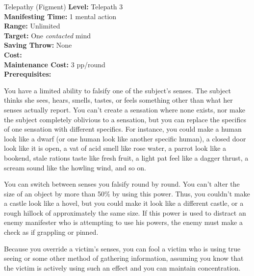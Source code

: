 {Telepathy (Figment)}
{
    \textbf{Level:}
    Telepath 3\\
    \textbf{Manifesting Time:}
    1 mental action\\
    \textbf{Range:}
    Unlimited\\
    \textbf{Target:}
    One \emph{contacted} mind\\
    \textbf{Saving Throw:}
    None\\
    \textbf{Cost:}
    \\
    \textbf{Maintenance Cost:}
    3 pp/round\\
    \textbf{Prerequisites:}
    \\
}
{
    You have a limited ability to falsify one of the subject's senses. The subject thinks she sees, hears, smells, tastes, or feels something other than what her senses actually report. You can't create a sensation where none exists, nor make the subject completely oblivious to a sensation, but you can replace the specifics of one sensation with different specifics. For instance, you could make a human look like a dwarf (or one human look like another specific human), a closed door look like it is open, a vat of acid smell like rose water, a parrot look like a bookend, stale rations taste like fresh fruit, a light pat feel like a dagger thrust, a scream sound like the howling wind, and so on.

    You can switch between senses you falsify round by round. You can't alter the size of an object by more than 50\% by using this power. Thus, you couldn't make a castle look like a hovel, but you could make it look like a different castle, or a rough hillock of approximately the same size. If this power is used to distract an enemy manifester who is attempting to use his powers, the enemy must make a  check as if grappling or pinned.

    Because you override a victim's senses, you can fool a victim who is using true seeing or some other method of gathering information, assuming you know that the victim is actively using such an effect and you can maintain concentration.
}
